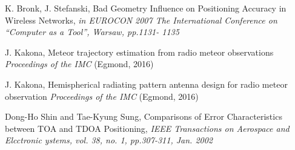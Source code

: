 \documentclass[twoside]{ctuthesis}
\theoremstyle{plain}
\theoremstyle{definition}
\theoremstyle{note}
\begin{document}
\begin{thebibliography}{99}
K. Bronk, J. Stefanski, 
Bad Geometry Influence on Positioning Accuracy in Wireless Networks,
\emph{in EUROCON 2007 The International Conference on “Computer as a Tool”, Warsaw, pp.1131- 1135}

J. Kakona,
Meteor trajectory estimation from radio meteor observations
\emph{Proceedings of the IMC} (Egmond, 2016)

J. Kakona,
Hemispherical radiating pattern antenna design for radio meteor observation
\emph{Proceedings of the IMC} (Egmond, 2016)

Dong-Ho Shin and Tae-Kyung Sung,
Comparisons of Error Characteristics between TOA and TDOA Positioning,
\emph{IEEE Transactions on Aerospace and Elcctronic ystems, vol. 38, no. 1, pp.307-311, Jan. 2002}


\end{thebibliography}
\end{document}

